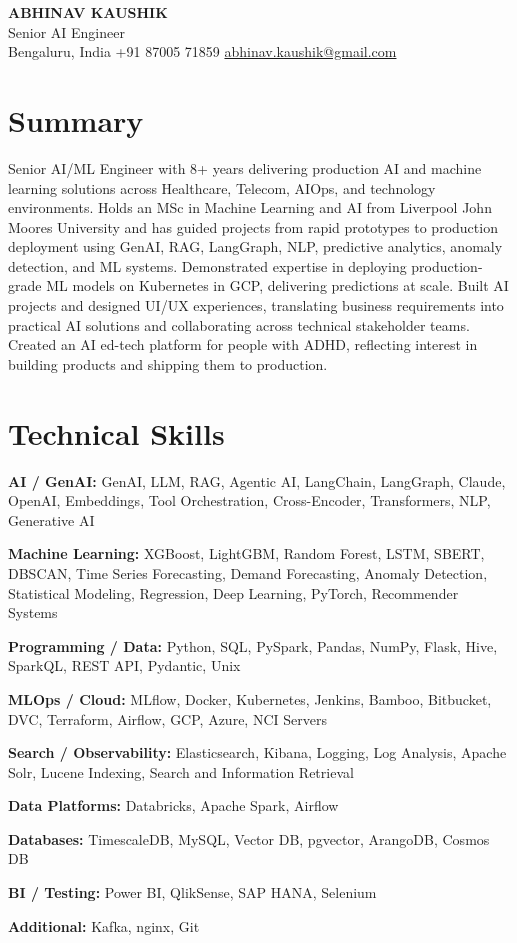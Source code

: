 \documentclass[10pt,a4paper]{article}
\begin{document}
\begin{center}
  {\LARGE\bfseries ABHINAV KAUSHIK}\\[2pt]
  {\large Senior AI Engineer}\\[2pt]
  Bengaluru, India \textbar{} +91 87005 71859 \textbar{} \href{mailto:abhinav.kaushik@gmail.com}{abhinav.kaushik@gmail.com}
\end{center}

\section{Summary}
Senior AI/ML Engineer with 8+ years delivering production AI and machine learning solutions across Healthcare, Telecom, AIOps, and technology environments. Holds an MSc in Machine Learning and AI from Liverpool John Moores University and has guided projects from rapid prototypes to production deployment using GenAI, RAG, LangGraph, NLP, predictive analytics, anomaly detection, and ML systems. Demonstrated expertise in deploying production-grade ML models on Kubernetes in GCP, delivering predictions at scale. Built AI projects and designed UI/UX experiences, translating business requirements into practical AI solutions and collaborating across technical stakeholder teams. Created an AI ed-tech platform for people with ADHD, reflecting interest in building products and shipping them to production.

\section{Technical Skills}
\textbf{AI / GenAI:} GenAI, LLM, RAG, Agentic AI, LangChain, LangGraph, Claude, OpenAI, Embeddings, Tool Orchestration, Cross-Encoder, Transformers, NLP, Generative AI\par
\textbf{Machine Learning:} XGBoost, LightGBM, Random Forest, LSTM, SBERT, DBSCAN, Time Series Forecasting, Demand Forecasting, Anomaly Detection, Statistical Modeling, Regression, Deep Learning, PyTorch, Recommender Systems\par
\textbf{Programming / Data:} Python, SQL, PySpark, Pandas, NumPy, Flask, Hive, SparkQL, REST API, Pydantic, Unix\par
\textbf{MLOps / Cloud:} MLflow, Docker, Kubernetes, Jenkins, Bamboo, Bitbucket, DVC, Terraform, Airflow, GCP, Azure, NCI Servers\par
\textbf{Search / Observability:} Elasticsearch, Kibana, Logging, Log Analysis, Apache Solr, Lucene Indexing, Search and Information Retrieval\par
\textbf{Data Platforms:} Databricks, Apache Spark, Airflow\par
\textbf{Databases:} TimescaleDB, MySQL, Vector DB, pgvector, ArangoDB, Cosmos DB\par
\textbf{BI / Testing:} Power BI, QlikSense, SAP HANA, Selenium\par
\textbf{Additional:} Kafka, nginx, Git\par
\end{document}
